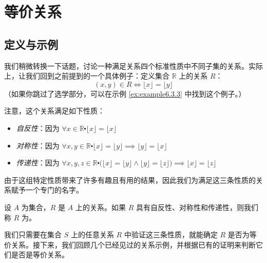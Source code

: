 \section{等价关系}

\subsection{定义与示例}

我们稍微转换一下话题，讨论一种满足关系四个标准性质中不同子集的关系。实际上，让我们回到之前提到的一个具体例子：定义集合 $\mathbb{R}$ 上的关系 $R$：
\[(x, y) \in R \iff \lfloor x \rfloor = \lfloor y \rfloor\]
（如果你跳过了选学部分，可以在示例 \ref{ex:example6.3.3} 中找到这个例子。）

注意，这个关系满足如下性质：
\begin{itemize}
    \item \emph{自反性}：因为 $\forall x \in \mathbb{R} \centerdot \lfloor x \rfloor = \lfloor x \rfloor$
    \item \emph{对称性}：因为 $\forall x, y \in \mathbb{R} \centerdot \lfloor x \rfloor = \lfloor y \rfloor \implies \lfloor y \rfloor = \lfloor x \rfloor$
    \item \emph{传递性}：因为 $\forall x, y, z \in \mathbb{R} \centerdot \big(\lfloor x \rfloor = \lfloor y \rfloor \land \lfloor y \rfloor = \lfloor z \rfloor \big) \implies \lfloor x \rfloor = \lfloor z \rfloor$
\end{itemize}
由于这组特定性质带来了许多有趣且有用的结果，因此我们为满足这三条性质的关系赋予一个专门的名字。

\begin{definition}
    设 $A$ 为集合，$R$ 是 $A$ 上的关系。如果 $R$ 具有自反性、对称性和传递性，则我们称 $R$ 为。
\end{definition}

我们只需要在集合 $S$ 上的任意关系 $R$ 中验证这三条性质，就能确定 $R$ 是否为等价关系。接下来，我们回顾几个已经见过的关系示例，并根据已有的证明来判断它们是否是等价关系。\\

